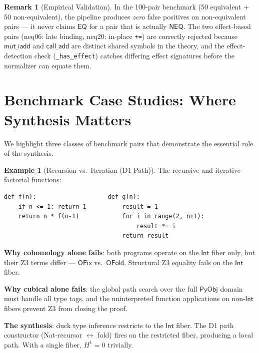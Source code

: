 \documentclass[11pt,a4paper]{report}
\theoremstyle{definition}
\newtheorem{example}[definition]{Example}
\newtheorem{remark}[definition]{Remark}
\theoremstyle{plain}
\newcommand{\PyObj}{\mathsf{PyObj}}
\newcommand{\Hone}{H^1}
\begin{document}
\begin{remark}[Empirical Validation]
In the 100-pair benchmark (50 equivalent + 50 non-equivalent), the
pipeline produces \emph{zero} false positives on non-equivalent
pairs --- it never claims $\mathsf{EQ}$ for a pair that is actually
$\mathsf{NEQ}$.  The two effect-based pairs (neq06: late binding,
neq20: in-place \texttt{+=}) are correctly rejected because
$\mathsf{mut\_iadd}$ and $\mathsf{call\_add}$ are distinct shared
symbols in the theory, and the effect-detection check
(\texttt{\_has\_effect}) catches differing effect signatures before
the normalizer can equate them.
\end{remark}

\section{Benchmark Case Studies: Where Synthesis Matters}
\label{sec:case-studies}

We highlight three classes of benchmark pairs that demonstrate the
essential role of the synthesis.

\begin{example}[Recursion vs.\ Iteration (D1 Path)]
\label{ex:case-rec-iter}
The recursive and iterative factorial functions:
\begin{lstlisting}
def f(n):                    def g(n):
    if n <= 1: return 1          result = 1
    return n * f(n-1)            for i in range(2, n+1):
                                     result *= i
                                 return result
\end{lstlisting}

\textbf{Why cohomology alone fails}: both programs operate on the
$\mathsf{Int}$ fiber only, but their Z3 terms differ ---
$\mathsf{OFix}$ vs.\ $\mathsf{OFold}$.  Structural Z3 equality
fails on the $\mathsf{Int}$ fiber.

\textbf{Why cubical alone fails}: the global path search over the full
$\PyObj$ domain must handle all type tags, and the uninterpreted
function applications on non-$\mathsf{Int}$ fibers prevent Z3 from
closing the proof.

\textbf{The synthesis}: duck type inference restricts to the
$\mathsf{Int}$ fiber.  The D1 path constructor
(Nat-recursor $\leftrightarrow$ fold) fires on the restricted fiber,
producing a local path.  With a single fiber, $\Hone = 0$ trivially.
\end{example}
\end{document}

